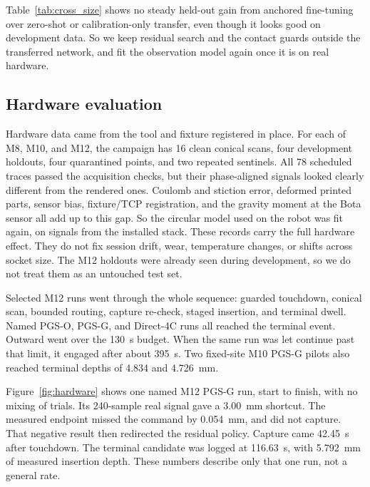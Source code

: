 \documentclass[letterpaper,10 pt,conference]{ieeeconf}
\newcommand{\pgso}{\textsc{PGS-O}}
\newcommand{\pgsg}{\textsc{PGS-G}}
\begin{document}
Table~\ref{tab:cross_size} shows no steady held-out gain from anchored
fine-tuning over zero-shot or calibration-only transfer, even though it
looks good on development data.  So we keep residual search and the contact
guards outside the transferred network, and fit the observation model again
once it is on real hardware.

\subsection{Hardware evaluation}

Hardware data came from the tool and fixture registered in place.  For each
of M8, M10, and M12, the campaign has 16 clean conical scans, four
development holdouts, four quarantined points, and two repeated sentinels.
All 78 scheduled traces passed the acquisition checks, but their
phase-aligned signals looked clearly different from the rendered ones.
Coulomb and stiction error, deformed printed parts, sensor bias,
fixture/TCP registration, and the gravity moment at the Bota sensor all add
up to this gap.  So the circular model used on the robot was fit again, on
signals from the installed stack.  These records carry the full hardware
effect.  They do not fix session drift, wear, temperature changes, or
shifts across socket size.  The M12 holdouts were already seen during
development, so we do not treat them as an untouched test set.

Selected M12 runs went through the whole sequence: guarded touchdown,
conical scan, bounded routing, capture re-check, staged insertion, and
terminal dwell.  Named \pgso{}, \pgsg{}, and Direct-4C runs all reached the
terminal event.  Outward went over the 130~s budget.  When the same run was
let continue past that limit, it engaged after about 395~s.  Two fixed-site
M10 \pgsg{} pilots also reached terminal depths of 4.834 and 4.726~mm.

Figure~\ref{fig:hardware} shows one named M12 \pgsg{} run, start to finish,
with no mixing of trials.  Its 240-sample real signal gave a 3.00~mm
shortcut.  The measured endpoint missed the command by 0.054~mm, and did
not capture.  That negative result then redirected the residual policy.
Capture came 42.45~s after touchdown.  The terminal candidate was logged at
116.63~s, with 5.792~mm of measured insertion depth.  These numbers
describe only that one run, not a general rate.
\end{document}
